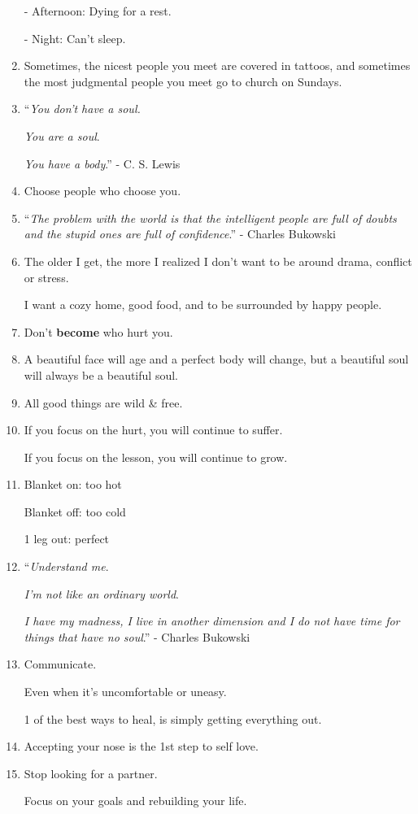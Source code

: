 \documentclass{article}
\begin{document}
\begin{enumerate}
	- Afternoon: Dying for a rest.
	
	- Night: Can't sleep.
	\item Sometimes, the nicest people you meet are covered in tattoos, and sometimes the most judgmental people you meet go to church on Sundays.
	\item ``\textit{You don't have a soul.}
	
	\textit{You are a soul}.
	
	\textit{You have a body}.'' - C. S. Lewis
	\item Choose people who choose you.
	\item ``\textit{The problem with the world is that the intelligent people are full of doubts and the stupid ones are full of confidence}.'' - Charles Bukowski
	\item The older I get, the more I realized I don't want to be around drama, conflict or stress.
	
	I want a cozy home, good food, and to be surrounded by happy people.
	\item Don't \textbf{become} who hurt you.
	\item A beautiful face will age and a perfect body will change, but a beautiful soul will always be a beautiful soul.
	\item All good things are wild \& free.
	\item If you focus on the hurt, you will continue to suffer.
	
	If you focus on the lesson, you will continue to grow.
	\item Blanket on: too hot
	
	Blanket off: too cold
	
	1 leg out: perfect
	\item ``\textit{Understand me}.
	
	\textit{I'm not like an ordinary world}.
	
	\textit{I have my madness, I live in another dimension and I do not have time for things that have no soul}.'' - Charles Bukowski
	\item Communicate.
	
	Even when it's uncomfortable or uneasy.
	
	1 of the best ways to heal, is simply getting everything out.
	\item Accepting your nose is the 1st step to self love.
	\item Stop looking for a partner.
	
	Focus on your goals and rebuilding your life.
	

\end{enumerate}
\end{document}
